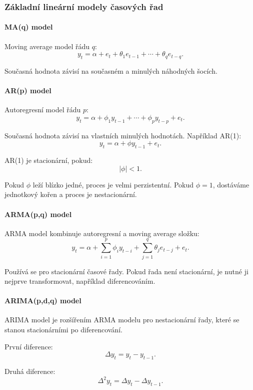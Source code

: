 \subsubsection{Základní lineární modely časových řad}

\paragraph{MA(q) model}

Moving average model řádu $q$:
\[
    y_t = \alpha + e_t+\theta_1e_{t-1}+\cdots+\theta_qe_{t-q}.
\]

Současná hodnota závisí na současném a minulých náhodných šocích.

\paragraph{AR(p) model}

Autoregresní model řádu $p$:
\[
    y_t = \alpha+\phi_1y_{t-1}+\cdots+\phi_py_{t-p}+e_t.
\]

Současná hodnota závisí na vlastních minulých hodnotách. Například AR(1):
\[
    y_t=\alpha+\phi y_{t-1}+e_t.
\]

AR(1) je stacionární, pokud:
\[
    |\phi|<1.
\]

Pokud $\phi$ leží blízko jedné, proces je velmi perzistentní. Pokud $\phi=1$, dostáváme jednotkový
kořen a proces je nestacionární.

\paragraph{ARMA(p,q) model}

ARMA model kombinuje autoregresní a moving average složku:
\[
    y_t =
    \alpha+
    \sum_{i=1}^{p}\phi_i y_{t-i}
    +
    \sum_{j=1}^{q}\theta_j e_{t-j}
    +e_t.
\]

Používá se pro stacionární časové řady. Pokud řada není stacionární, je nutné ji nejprve transformovat,
například diferencováním.

\paragraph{ARIMA(p,d,q) model}

ARIMA model je rozšířením ARMA modelu pro nestacionární řady, které se stanou stacionárními po
diferencování.

První diference:
\[
    \Delta y_t = y_t-y_{t-1}.
\]

Druhá diference:
\[
    \Delta^2 y_t = \Delta y_t-\Delta y_{t-1}.
\]


